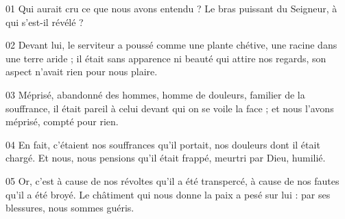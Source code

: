 01 Qui aurait cru ce que nous avons entendu ? Le bras puissant du Seigneur, à qui s’est-il révélé ?

02 Devant lui, le serviteur a poussé comme une plante chétive, une racine dans une terre aride ; il était sans apparence ni beauté qui attire nos regards, son aspect n’avait rien pour nous plaire.

03 Méprisé, abandonné des hommes, homme de douleurs, familier de la souffrance, il était pareil à celui devant qui on se voile la face ; et nous l’avons méprisé, compté pour rien.

04 En fait, c’étaient nos souffrances qu’il portait, nos douleurs dont il était chargé. Et nous, nous pensions qu’il était frappé, meurtri par Dieu, humilié.

05 Or, c’est à cause de nos révoltes qu’il a été transpercé, à cause de nos fautes qu’il a été broyé. Le châtiment qui nous donne la paix a pesé sur lui : par ses blessures, nous sommes guéris.
